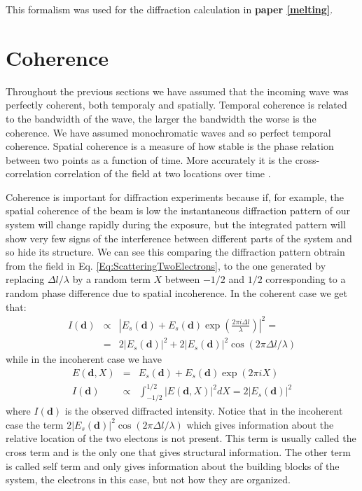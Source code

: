 This formalism was used for the diffraction calculation in {\bf paper \ref{melting}}.

\section{Coherence}\label{coherence}

Throughout the previous sections we have assumed that the incoming wave was
perfectly coherent, both temporaly and spatially. Temporal coherence is related
to the bandwidth of the wave, the larger the bandwidth the worse is the
coherence. We have assumed monochromatic waves and so perfect temporal
coherence. Spatial coherence is a measure of how stable is the phase relation between
two points as a function of time. More accurately it is the cross-correlation
correlation of the field at two locations over time \cite{Attwood2007Soft}. 

Coherence is important for diffraction experiments because if, for example, the
spatial coherence of the beam is low the instantaneous diffraction pattern of
our system will change rapidly during the exposure, but the integrated pattern
will show very few signs of the interference between different parts of the
system and so hide its structure. We can see this comparing the diffraction
pattern obtrain from the field in Eq. \ref{Eq:ScatteringTwoElectrons}, to the
one generated by replacing $\Delta l/\lambda$ by a random term $X$
between $-1/2$ and $1/2$ corresponding to a random phase difference due to
spatial incoherence. In the coherent case we get that:
\begin{eqnarray}
  I(\mathbf d)  & \propto & |E_s(\mathbf d) + E_s(\mathbf d) \exp(\frac{2 \pi i \Delta
    l}{\lambda})|^2  = \nonumber \\
 & = & 2 |E_s(\mathbf d)|^2 + 2 |E_s(\mathbf d)|^2
  \cos(2 \pi \Delta l / \lambda)
\end{eqnarray}
 while in the incoherent case we have
\begin{eqnarray}
 E(\mathbf d,X) & = &  E_s(\mathbf d) + E_s(\mathbf d) \exp(2 \pi i X) \nonumber
 \\
I(\mathbf d)  & \propto & \int_{-1/2}^{1/2} |E(\mathbf d,X)|^2 dX = 2 |E_s(\mathbf d)|^2
\end{eqnarray}
where $I(\mathbf d)$ is the observed diffracted intensity. Notice that in the
incoherent case the term $2 |E_s(\mathbf d)|^2 \cos(2 \pi \Delta l / \lambda)$
which gives information about the relative location of the two electons is not
present. This term is usually called the cross term and is the only one that
gives structural information. The other term is called self term and only gives
information about the building blocks of the system, the electrons in this case,
but not how they are organized.

